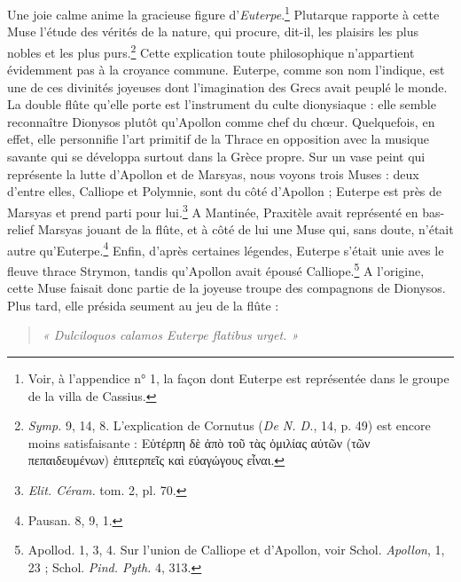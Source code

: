 \documentclass[a4paper, 11pt, oneside, polutonikogreek, french]{article}
\begin{document}
Une joie calme anime la gracieuse figure d'\emph{Euterpe}.\footnote{Voir, à l'appendice n° 1, la façon dont Euterpe est représentée dans le groupe de la villa de Cassius.} Plutarque rapporte à cette Muse l'étude des vérités de la nature, qui procure, dit-il, les plaisirs les plus nobles et les plus purs.\footnote{\emph{Symp.} 9, 14, 8. L'explication de Cornutus (\emph{De N. D.}, 14, p. 49) est encore moins satisfaisante : Εὐτέρπη δὲ ἀπὸ τοῦ τὰς ὁμιλίας αὐτῶν (τῶν πεπαιδευμένων) ἐπιτερπεῖς καὶ εὐαγώγους εἶναι.} Cette explication toute philosophique n'appartient évidemment pas à la croyance commune. Euterpe, comme son nom l'indique, est une de ces divinités joyeuses dont l'imagination des Grecs avait peuplé le monde. La double flûte qu'elle porte est l'instrument du culte dionysiaque : elle semble reconnaître Dionysos plutôt qu'Apollon comme chef du chœur. Quelquefois, en effet, elle personnifie l'art primitif de la Thrace en opposition avec la musique savante qui se développa surtout dans la Grèce propre. Sur un vase peint qui représente la lutte d'Apollon et de Marsyas, nous voyons trois Muses : deux d'entre elles, Calliope et Polymnie, sont du côté d'Apollon ; Euterpe est près de Marsyas et prend parti pour lui.\footnote{\emph{Elit. Céram.} tom. 2, pl. 70.} A Mantinée, Praxitèle avait représenté en bas-relief Marsyas jouant de la flûte, et à côté de lui une Muse qui, sans doute, n'était autre qu'Euterpe.\footnote{Pausan. 8, 9, 1.} Enfin, d'après certaines légendes, Euterpe s'était unie aves le fleuve thrace Strymon, tandis qu'Apollon avait épousé Calliope.\footnote{Apollod. 1, 3, 4. Sur l'union de Calliope et d'Apollon, voir Schol. \emph{Apollon}, 1, 23 ; Schol. \emph{Pind. Pyth.} 4, 313.} A l'origine, cette Muse faisait donc partie de la joyeuse troupe des compagnons de Dionysos. Plus tard, elle présida seument au jeu de la flûte :
\begin{quotation}
\emph{« Dulciloquos calamos Euterpe flatibus urget. »}
\end{quotation}
\end{document}
